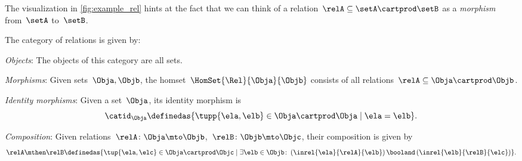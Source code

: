The visualization in \cref{fig:example_rel} hints at the fact that we can think of a relation~$\relA \subseteq \setA \cartprod \setB$ as a \emph{morphism} from~$\setA$ to~$\setB$.


\begin{ctdefinition}
    \label{def:Rel}
    The category of relations \iindex{\Rel}  is given by:
    \begin{compactenum}
        \item \emph{Objects}: The objects of this category are all sets.
        \item \emph{Morphisms}: Given sets~$\Obja, \Objb$, the homset~$\HomSet{\Rel}{\Obja}{\Objb}$ consists of all relations~$\relA\subseteq \Obja\cartprod \Objb$.
        \item \emph{Identity morphisms}: Given a set~$\Obja$, its identity morphism is
              \begin{equation}
                  \catid_\Obja \definedas \{ \tupp{\ela,\elb} \in \Obja \cartprod \Obja \mid  \ela = \elb \}.
              \end{equation}
        \item \emph{Composition}: Given relations~$\relA \colon \Obja\mto \Objb$,~$\relB \colon \Objb\mto \Objc$, their composition is given by
              \begin{equation}
                  \label{eq:RelCompRule}
                  \relA \mthen \relB \definedas \{\tup{\ela,\elc} \in \Obja \cartprod \Objc \mid  \exists \elb \in \Objb \colon \left(\inrel{\ela}{\relA}{\elb} \right) \booland \left(\inrel{\elb}{\relB}{\elc}\right)\}.
              \end{equation}
    \end{compactenum}
\end{ctdefinition}

